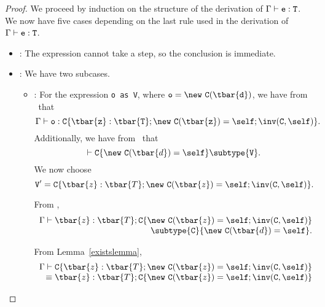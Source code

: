 \begin{proof}
We proceed by induction on the
structure of the derivation of $\Gamma \vdash {\tt e}: {\tt T}$.  We now have five
cases depending on the last rule used in the derivation
of $\Gamma \vdash {\tt e}: {\tt T}$.
\begin{itemize}
\item
\TVar: The expression cannot take a step, so the conclusion is immediate.
\item
\TCast: We have two subcases.
   \begin{itemize}
   \item
   \RCast:  For the expression {\tt o~as~V}, where 
            ${\tt o} = {\tt \new\ {\tt C(\tbar{d})}}$,
            we have from \TNew\ that 
            $$\Gamma \vdash {\tt o: {\tt C}\{\tbar{z}: \tbar{T}; \new\ {\tt C}(\tbar{z}) = \self; \inv({\tt C},\self)\}}.$$
            Additionally, we have from \RCast\ that 
            $$\vdash {\tt C}\{\new\ {\tt C}(\tbar{d}) = \self\} \subtype {\tt V}.$$
            We now choose 
            $${\tt V}' = {{\tt C}\{\tbar{z}: \tbar{T}; \new\ {\tt C}(\tbar{z}) = \self; \inv({\tt C},\self)\}}.$$


            From ,
            $$
            \begin{array}{r}
            \Gamma \vdash \tbar{z}: \tbar{T}; {{\tt C}\{\new\ {\tt C}(\tbar{z}) = \self; \inv({\tt C},\self)\}} \\
            \subtype {\tt C}\{\new\ {\tt C}(\tbar{d}) = \self\}.
            \end{array}
            $$

            From Lemma~\ref{existslemma},
            $$
            \begin{array}{r}
            \Gamma \vdash {{\tt C}\{\tbar{z}: \tbar{T}; \new\ {\tt C}(\tbar{z}) = \self; \inv({\tt C},\self)\}} \\
            \equiv \tbar{z}: \tbar{T}; {{\tt C}\{\new\ {\tt C}(\tbar{z}) = \self; \inv({\tt C},\self)\}}
            \end{array}
            $$


\end{itemize}
\end{itemize}
\end{proof}
